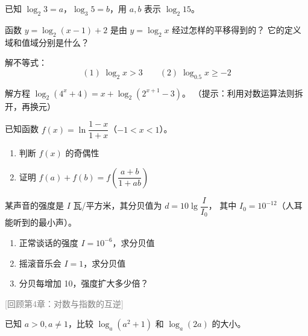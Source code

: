 \begin{exercise}[4]
已知 \(\log_2 3 = a\)，\(\log_3 5 = b\)，用 \(a, b\) 表示 \(\log_2 15\)。

\end{exercise}


\begin{exercise}[4]
函数 \(y = \log_2(x-1) + 2\) 是由 \(y = \log_2 x\) 经过怎样的平移得到的？
它的定义域和值域分别是什么？

\end{exercise}


\begin{exercise}[4]
解不等式：
\[
(1)\; \log_2 x > 3 \qquad (2)\; \log_{0.5} x \ge -2
\]


\end{exercise}


\begin{exercise}[5]
解方程 \(\log_2(4^x + 4) = x + \log_2(2^{x+1} - 3)\)。
（提示：利用对数运算法则拆开，再换元）

\end{exercise}


\begin{exercise}[5]
已知函数 \(f(x) = \ln \dfrac{1-x}{1+x}\)（\(-1 < x < 1\)）。
\begin{enumerate}
  \item[(1)] 判断 \(f(x)\) 的奇偶性
  \item[(2)] 证明 \(f(a) + f(b) = f\left(\dfrac{a+b}{1+ab}\right)\)
\end{enumerate}

\end{exercise}


\begin{exercise}[5]
某声音的强度是 \(I\) 瓦/平方米，其分贝值为 \(d = 10 \lg \dfrac{I}{I_0}\)，
其中 \(I_0 = 10^{-12}\)（人耳能听到的最小声）。
\begin{enumerate}
  \item[(1)] 正常谈话的强度 \(I = 10^{-6}\)，求分贝值
  \item[(2)] 摇滚音乐会 \(I = 1\)，求分贝值
  \item[(3)] 分贝每增加 10，强度扩大多少倍？
\end{enumerate}

\end{exercise}

\qquad \textcolor{gray}{[回顾第4章：对数与指数的互逆]}%

\begin{exercise}[5]
已知 \(a > 0, a \neq 1\)，比较 \(\log_a (a^2 + 1)\) 和 \(\log_a (2a)\) 的大小。


\end{exercise}


